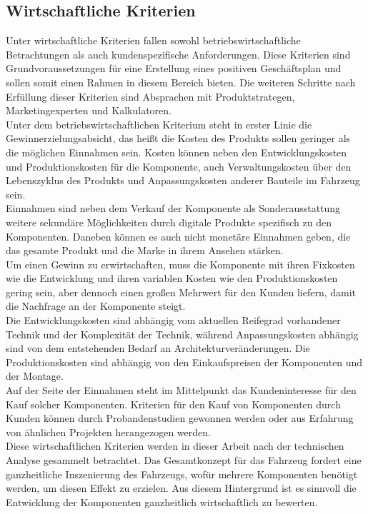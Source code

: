 \subsection{Wirtschaftliche Kriterien}
Unter wirtschaftliche Kriterien fallen sowohl betriebswirtschaftliche Betrachtungen als auch kundenspezifische Anforderungen. Diese Kriterien sind Grundvoraussetzungen für eine Erstellung eines positiven Geschäftsplan und sollen somit einen Rahmen in diesem Bereich bieten. Die weiteren Schritte nach Erfüllung dieser Kriterien sind Absprachen mit Produktstrategen, Marketingexperten und Kalkulatoren. \\
Unter dem betriebswirtschaftlichen Kriterium steht in erster Linie die Gewinnerzielungsabsicht, das heißt die Kosten des Produkts sollen geringer als die möglichen Einnahmen sein. Kosten können neben den Entwicklungskosten und Produktionskosten für die Komponente, auch Verwaltungskosten über den Lebenszyklus des Produkts und Anpassungskosten anderer Bauteile im Fahrzeug sein. \\
Einnahmen sind neben dem Verkauf der Komponente als Sonderausstattung weitere sekundäre Möglichkeiten durch digitale Produkte spezifisch zu den Komponenten. Daneben können es auch nicht monetäre Einnahmen geben, die das gesamte Produkt und die Marke in ihrem Ansehen stärken.\\
Um einen Gewinn zu erwirtschaften, muss die Komponente mit ihren Fixkosten wie die Entwicklung und ihren variablen Kosten wie den Produktionskosten gering sein, aber dennoch einen großen Mehrwert für den Kunden liefern, damit die Nachfrage an der Komponente steigt. \\
Die Entwicklungskosten sind abhängig vom aktuellen Reifegrad vorhandener Technik und der Komplexität der Technik, während Anpassungskosten abhängig sind von dem entstehenden Bedarf an Architekturveränderungen. Die Produktionskosten sind abhängig von den Einkaufspreisen der Komponenten und der Montage. \\
Auf der Seite der Einnahmen steht im Mittelpunkt das Kundeninteresse für den Kauf solcher Komponenten. Kriterien für den Kauf von Komponenten durch Kunden können durch Probandenstudien gewonnen werden oder aus Erfahrung von ähnlichen Projekten herangezogen werden. \\
Diese wirtschaftlichen Kriterien werden in dieser Arbeit nach der technischen Analyse gesammelt betrachtet. Das Gesamtkonzept für das Fahrzeug fordert eine ganzheitliche Inszenierung des Fahrzeugs, wofür mehrere Komponenten benötigt werden, um diesen Effekt zu erzielen. Aus diesem Hintergrund ist es sinnvoll die Entwicklung der Komponenten ganzheitlich wirtschaftlich zu bewerten. \\
